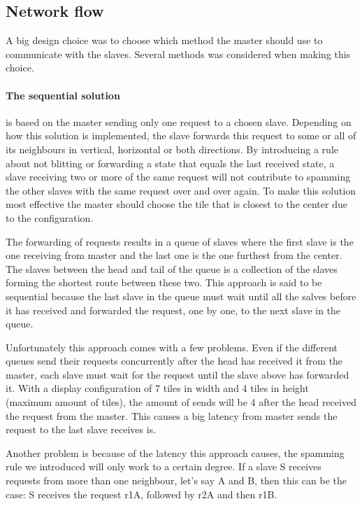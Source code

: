 \documentclass[12pt, a4paper, oneside]{article}
\begin{document}
\subsection{Network flow}
A big design choice was to choose which method the master should use to communicate with the slaves. Several methods was considered when making this choice. 

\paragraph{The sequential solution}
is based on the master sending only one request to a chosen slave. Depending on how this solution is implemented, the slave forwards this request to some or all of its neighbours in vertical, horizontal or both directions. By introducing a rule about not blitting or forwarding a state that equals the last received state, a slave receiving two or more of the same request will not contribute to spamming the other slaves with the same request over and over again. To make this solution most effective the master should choose the tile that is closest to the center due to the configuration.

The forwarding of requests results in a queue of slaves where the first slave is the one receiving from master and the last one is the one furthest from the center. The slaves between the head and tail of the queue is a collection of the slaves forming the shortest route between these two. 
This approach is said to be sequential because the last slave in the queue must wait until all the salves before it has received and forwarded the request, one by one, to the next slave in the queue.

Unfortunately this approach comes with a few problems. Even if the different queues send their requests concurrently after the head has received it from the master, each slave must wait for the request until the slave above has forwarded it. With a display configuration of 7 tiles in width and 4 tiles in height (maximum amount of tiles), the amount of sends will be 4 after the head received the request from the master. This causes a big latency from master sends the request to the last slave receives is. 

Another problem is because of the latency this approach causes, the spamming rule we introduced will only work to a certain degree. If a slave S receives requests from more than one neighbour, let's say A and B, then this can be the case:
S receives the request r1A, followed by r2A and then r1B.
\end{document}
